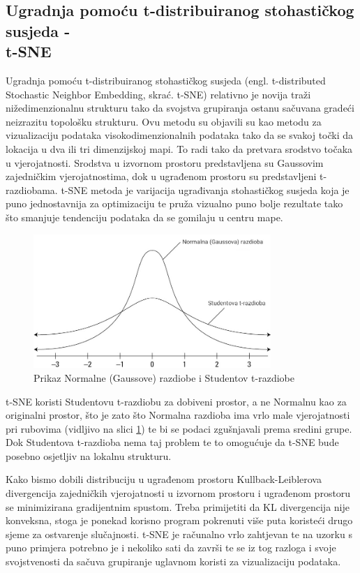 \documentclass[times, utf8, diplomski]{fer}
\begin{document}
\subsection{Ugradnja pomoću t-distribuiranog stohastičkog susjeda -\\ t-SNE}
Ugradnja pomoću t-distribuiranog stohastičkog susjeda (engl. t-distributed Stochastic Neighbor Embedding, skrać. t-SNE) relativno je novija traži nižedimenzionalnu strukturu tako da svojstva grupiranja ostanu sačuvana gradeći neizrazitu  topološku strukturu. Ovu metodu su objavili su \cite{maaten2008visualizing} kao metodu za vizualizaciju podataka visokodimenzionalnih podataka tako da se svakoj točki da lokacija u dva ili tri dimenzijskoj mapi. To radi tako da pretvara srodstvo točaka u vjerojatnosti. Srodstva u izvornom prostoru predstavljena su Gaussovim zajedničkim vjerojatnostima, dok u ugrađenom prostoru su predstavljeni t-razdiobama. t-SNE metoda je varijacija ugrađivanja stohastičkog susjeda  koja je puno jednostavnija za optimizaciju te pruža vizualno puno bolje rezultate tako što smanjuje tendenciju podataka da se gomilaju u centru mape.
\begin{figure}[htb]
    \centering
    \includegraphics[width=9cm]{resources/images/reduction/tsne.jpg}
    \caption{Prikaz Normalne (Gaussove) razdiobe i Studentov t-razdiobe}
    \label{fig:tsne}
\end{figure}

t-SNE koristi Studentovu t-razdiobu za dobiveni prostor, a ne Normalnu kao za originalni prostor, što je zato što Normalna razdioba ima vrlo male vjerojatnosti pri rubovima (vidljivo na slici \ref{fig:tsne}) te bi se podaci zgušnjavali prema sredini grupe. Dok Studentova t-razdioba nema taj problem te to omogućuje da t-SNE bude posebno osjetljiv na lokalnu strukturu.

Kako bismo dobili distribuciju u ugrađenom prostoru Kullback-Leiblerova divergencija zajedničkih vjerojatnosti u izvornom prostoru i ugrađenom prostoru se minimizirana gradijentnim spustom. Treba primijetiti da KL divergencija nije konveksna, stoga je ponekad korisno program pokrenuti više puta koristeći drugo sjeme za ostvarenje slučajnosti. t-SNE je računalno vrlo zahtjevan te na uzorku s puno primjera potrebno je i nekoliko sati da završi te se iz tog razloga i svoje svojstvenosti da sačuva grupiranje uglavnom koristi za vizualizaciju podataka.
\end{document}
